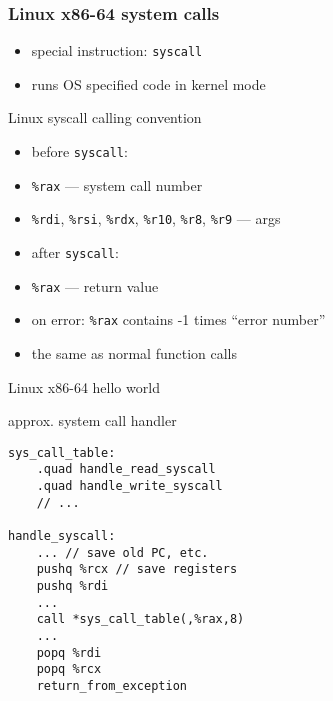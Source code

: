 \begin{frame}
\frametitle{Linux x86-64 system calls}
\begin{itemize}
\item special instruction: {\tt syscall}
\item runs OS specified code in kernel mode
\end{itemize}
\end{frame}

\begin{frame}[fragile,label=LinuxSyscall]{Linux syscall calling convention}
\begin{itemize}
\item before {\tt syscall}:
\item \lstinline|%rax| --- system call number
\item \lstinline|%rdi|, \lstinline|%rsi|, \lstinline|%rdx|, \lstinline|%r10|, \lstinline|%r8|, \lstinline|%r9| --- args
\vspace{.5cm}
\item after {\tt syscall}:
\item \lstinline|%rax| --- return value
\item on error: \lstinline|%rax| contains -1 times ``error number''
\vspace{.5cm}
\item {} the same as normal function calls
\end{itemize}
\end{frame}

\begin{frame}{Linux x86-64 hello world}

\end{frame}

\begin{frame}[fragile,label=sysHandler]{approx. system call handler}
\begin{lstlisting}
sys_call_table:
    .quad handle_read_syscall
    .quad handle_write_syscall
    // ...

handle_syscall:
    ... // save old PC, etc.
    pushq %rcx // save registers
    pushq %rdi
    ...
    call *sys_call_table(,%rax,8)
    ...
    popq %rdi
    popq %rcx
    return_from_exception
\end{lstlisting}
\end{frame}


